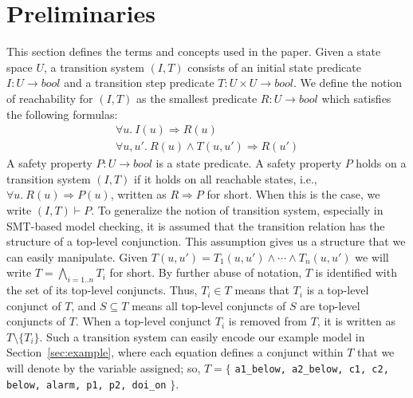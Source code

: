 \section{Preliminaries}
\label{sec:background}

\newcommand{\bool}[0]{\mathit{bool}}
\newcommand{\reach}[0]{\mathit{R}}
\newcommand{\ite}[3]{\mathit{if}\ {#1}\ \mathit{then}\ {#2}\ \mathit{else}\ {#3}}

This section defines the terms and concepts used in the paper. Given a state space $U$, a transition system $(I,T)$ consists of an
initial state predicate $I : U \to \bool$ and a transition step
predicate $T : U \times U \to \bool$.
We define the notion of
reachability for $(I, T)$ as the smallest predicate $\reach : U \to
\bool$ which satisfies the following formulas:
\begin{gather*}
  \forall u.~ I(u) \Rightarrow \reach(u) \\
  \forall u, u'.~ \reach(u) \land T(u, u') \Rightarrow \reach(u')
\end{gather*}
A safety property $P : U \to \bool$ is a state predicate. A safety
property $P$ holds on a transition system $(I, T)$ if it holds on all
reachable states, i.e., $\forall u.~ \reach(u) \Rightarrow P(u)$,
written as $\reach \Rightarrow P$ for short. When this is the case, we
write $(I, T)\vdash P$. To generalize the notion of transition system, especially in SMT-based model checking, it is assumed that the transition relation has the structure of a top-level conjunction. This assumption gives us a structure that we can easily manipulate. Given $T(u, u') = T_1(u, u') \land \cdots \land T_n(u, u')$ we will write $T = \bigwedge_{i=1..n}T_i$ for short.
By further abuse of notation,
$T$ is identified with the set of its top-level conjuncts. Thus, $T_i \in
T$ means that $T_i$ is a top-level conjunct of $T$, and $S
\subseteq T$ means all top-level conjuncts of $S$ are top-level
conjuncts of $T$. When a top-level conjunct $T_i$ is removed from $T$, it is written as $T \setminus \{T_i\}$. Such a transition system can easily encode our example model in Section~\ref{sec:example}, where each equation defines a conjunct within $T$ that we will denote by the variable assigned; so, $T = \{$ {\small \texttt{a1\_below, a2\_below, c1, c2, below, alarm, p1, p2, doi\_on}} $\}$.

